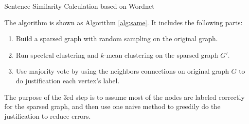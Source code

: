 \begin{algorithm} [h!]                     %
\caption{Sentence Similarity Calculation based on Wordnet}          %
\label{alg:same}                           %
\begin{algorithmic} [1]                   %
 \EndFor
   \EndIf
 \EndFor
 
 \EndFor
\end{algorithmic}
\end{algorithm}

The algorithm is shown as Algorithm \ref{alg:same}. It includes the following parts:
\begin{enumerate}
\item Build a sparsed graph with random sampling on the original graph.
\item Run spectral clustering and $k$-mean clustering on the sparsed graph $G'$.
\item Use majority vote by using the neighbors connections on original graph $G$ to do justification each vertex's label.
\end{enumerate}
The purpose of the 3rd step is to assume most of the nodes are labeled correctly for the sparsed graph, and then use one naive method to greedily do the justification to reduce errors.

